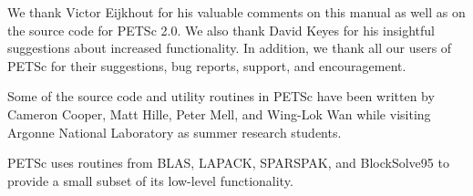 

\medskip \medskip 
We thank Victor Eijkhout for his valuable comments on this
manual as well as on the source code for PETSc 2.0.  We also thank David
Keyes for his insightful suggestions about increased functionality.
In addition, we thank all our users  of PETSc for
their suggestions, bug reports, support, and encouragement.

\vspace{.3in}
Some of the source code and utility routines in PETSc have been
written by Cameron Cooper, Matt Hille, Peter Mell, and Wing-Lok Wan
while visiting Argonne National Laboratory as summer research
students.

\vspace{.3in}
PETSc uses routines from BLAS, LAPACK, SPARSPAK, and BlockSolve95 to
provide a small subset of its low-level functionality.
